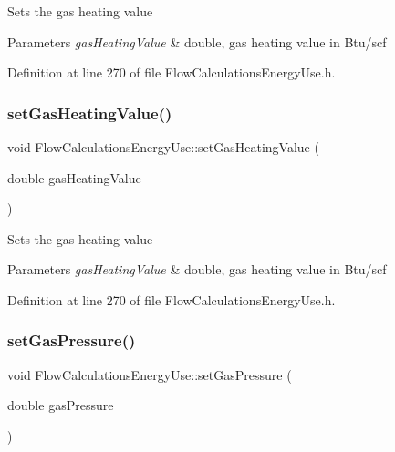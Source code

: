 Sets the gas heating value


\begin{DoxyParams}{Parameters}
{\em gas\+Heating\+Value} & double, gas heating value in Btu/scf \\
\hline
\end{DoxyParams}


Definition at line 270 of file Flow\+Calculations\+Energy\+Use.\+h.

\mbox{\label{class_flow_calculations_energy_use_ae51a954fb1f44d6b114f66e69bdf754e}} 
\subsubsection{\texorpdfstring{set\+Gas\+Heating\+Value()}{setGasHeatingValue()}\hspace{0.1cm}{\footnotesize\ttfamily [3/3]}}
{\footnotesize\ttfamily void Flow\+Calculations\+Energy\+Use\+::set\+Gas\+Heating\+Value (\begin{DoxyParamCaption}\item[{double}]{gas\+Heating\+Value }\end{DoxyParamCaption})\hspace{0.3cm}{\ttfamily [inline]}}

Sets the gas heating value


\begin{DoxyParams}{Parameters}
{\em gas\+Heating\+Value} & double, gas heating value in Btu/scf \\
\hline
\end{DoxyParams}


Definition at line 270 of file Flow\+Calculations\+Energy\+Use.\+h.

\mbox{\label{class_flow_calculations_energy_use_a3b87a7c24340c618ed62ced5aece36b2}} 
\subsubsection{\texorpdfstring{set\+Gas\+Pressure()}{setGasPressure()}\hspace{0.1cm}{\footnotesize\ttfamily [1/3]}}
{\footnotesize\ttfamily void Flow\+Calculations\+Energy\+Use\+::set\+Gas\+Pressure (\begin{DoxyParamCaption}\item[{double}]{gas\+Pressure }\end{DoxyParamCaption})\hspace{0.3cm}{\ttfamily [inline]}}

